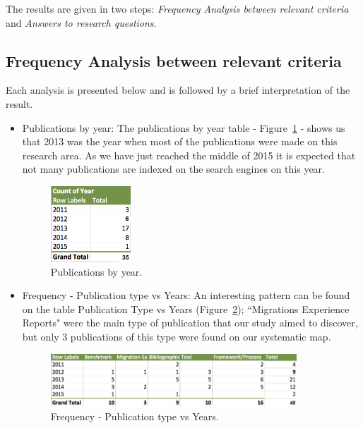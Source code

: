 \documentclass[conference, 10pt, a4paper]{IEEEtran}
\begin{document}
The results are given in two steps: \textit{Frequency Analysis between relevant criteria} and \textit{Answers to research questions}. 

\subsection{Frequency Analysis between relevant criteria}
\label{frequencyAnalysis}

Each analysis is presented below and is followed by a brief interpretation of the result. 



\begin{itemize}
\item{Publications by year: }
The publications by year table - Figure~\ref{fig:pubByYear} -  shows us that 2013 was the year when most of the publications were made on this research area. As we have just reached  the middle of 2015 it is expected that not many publications are indexed on the search engines on this year.
\begin{figure}[htb!]
\centering
\includegraphics[width=30mm]{graph2.png}
\caption{Publications by year.\label{fig:pubByYear}}
\end{figure}



\item {Frequency - Publication type vs Years: }
An interesting pattern can be found on the table Publication Type vs Years (Figure~\ref{fig:pubTypeVsYears}); ``Migrations Experience Reports" were the main type of publication that our study aimed to discover, but only 3 publications of this type were found on our systematic map. 

\begin{figure}[htb!]
\centering
\includegraphics[width=92mm]{graph1.png}
\caption{Frequency - Publication type vs Years.\label{fig:pubTypeVsYears}}
\end{figure}



\end{itemize}
\end{document}
